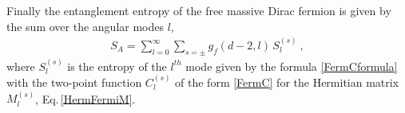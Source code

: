 Finally the entanglement entropy of the free massive Dirac fermion is given by the sum over the angular modes $l$,
\begin{align}
	S_A = \sum_{l=0}^\infty  \sum_{s=\pm} g_f(d-2,l)\, S_l^{(s)} \ ,
\end{align}
where $S_l^{(s)}$ is the entropy of the $l^{th}$ mode given by the formula \eqref{FermCformula} with the two-point function $C_l^{(s)}$ of the form \eqref{FermC} for the Hermitian matrix $M_l^{(s)}$, Eq.\,\eqref{HermFermiM}.

\endinput